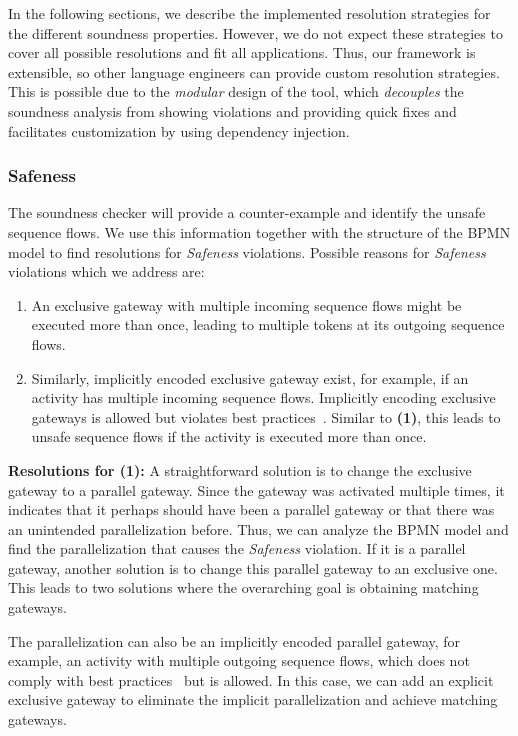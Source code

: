 \documentclass[runningheads]{llncs}
\begin{document}
In the following sections, we describe the implemented resolution strategies for the different soundness properties.
However, we do not expect these strategies to cover all possible resolutions and fit all applications.
Thus, our framework is extensible, so other language engineers can provide custom resolution strategies.
This is possible due to the \textit{modular} design of the tool, which \textit{decouples} the soundness analysis from showing violations and providing quick fixes and facilitates customization by using dependency injection.

\subsubsection{Safeness}
The soundness checker will provide a counter-example and identify the unsafe sequence flows.
We use this information together with the structure of the BPMN model to find resolutions for \textit{Safeness} violations.
Possible reasons for \textit{Safeness} violations which we address are:

\begin{enumerate}
	\item An exclusive gateway with multiple incoming sequence flows might be executed more than once, leading to multiple tokens at its outgoing sequence flows.
	\item Similarly, implicitly encoded exclusive gateway exist, for example, if an activity has multiple incoming sequence flows.
	Implicitly encoding exclusive gateways is allowed but violates best practices~\cite{camundaservicesgmbhBpmnlint2024}.
	Similar to \textbf{(1)}, this leads to unsafe sequence flows if the activity is executed more than once.
\end{enumerate}


\textbf{Resolutions for (1):} A straightforward solution is to change the exclusive gateway to a parallel gateway.
Since the gateway was activated multiple times, it indicates that it perhaps should have been a parallel gateway or that there was an unintended parallelization before.
Thus, we can analyze the BPMN model and find the parallelization that causes the \textit{Safeness} violation.
If it is a parallel gateway, another solution is to change this parallel gateway to an exclusive one.
This leads to two solutions where the overarching goal is obtaining matching gateways.

The parallelization can also be an implicitly encoded parallel gateway, for example, an activity with multiple outgoing sequence flows, which does not comply with best practices~\cite{camundaservicesgmbhBpmnlint2024} but is allowed.
In this case, we can add an explicit exclusive gateway to eliminate the implicit parallelization and achieve matching gateways.
\end{document}
